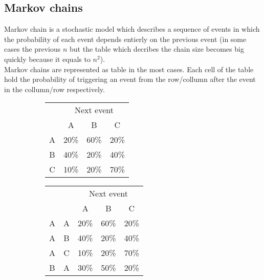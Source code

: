 \documentclass[]{article}
\begin{document}
        \subsection{Markov chains}
                Markov chain is a stochastic model which describes a sequence of events in which the probability of each event depends entierly on the previous event (in some cases the previous $n$ but the table which decribes the chain size becomes big quickly because it equals to $n^2$).\\
                Markov chains are represented as table in the most cases. Each cell of the table hold the probability of triggering an event from the row/collumn after the event in the collumn/row respectively.
                \begin{figure}[h]
                    \centering
                    \begin{subfigure}[a]{0.4\textwidth}
                        \begin{tabular}{|c|c|c|c|}
                            \hline
                            & \multicolumn{3}{|c|}{Next event} \\ \cline{2-4}
                            & A & B & C \\ \hline
                            A & 20\% & 60\% & 20\% \\ \hline
                            B & 40\% & 20\% & 40\% \\ \hline
                            C & 10\% & 20\% & 70\% \\ \hline
                        \end{tabular}
                    \end{subfigure}
                    \begin{subfigure}[b]{0.4\textwidth}
                        \begin{tabular}{|c|c|c|c|c|}
                            \hline
                            \multicolumn{2}{|c|}{} & \multicolumn{3}{|c|}{Next event} \\ \cline{3-5}
                            \multicolumn{2}{|c|}{} & A & B & C \\ \hline
                            A & A & 20\% & 60\% & 20\% \\ \hline
                            A & B & 40\% & 20\% & 40\% \\ \hline
                            A & C & 10\% & 20\% & 70\% \\ \hline
                            B & A & 30\% & 50\% & 20\% \\ \hline

\end{tabular}
\end{subfigure}
\end{figure}
\end{document}
